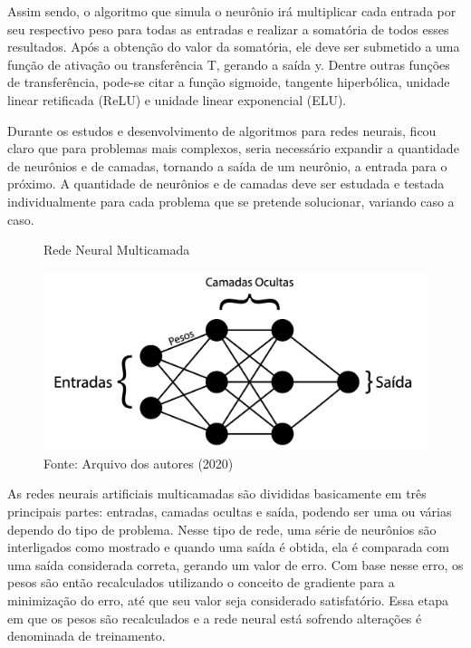 \par Assim sendo, o algoritmo que simula o neurônio irá multiplicar cada entrada por seu respectivo peso para todas as entradas e realizar a somatória de todos esses resultados. Após a obtenção do valor da somatória, ele deve ser submetido a uma função de ativação ou transferência T, gerando a saída y. Dentre outras funções de transferência, pode-se citar a função sigmoide, tangente hiperbólica, unidade linear retificada (ReLU) e unidade linear exponencial (ELU).

\par Durante os estudos e desenvolvimento de algoritmos para redes neurais, ficou claro que para problemas mais complexos, seria necessário expandir a quantidade de neurônios e de camadas, tornando a saída de um neurônio, a entrada para o próximo. A quantidade de neurônios e de camadas deve ser estudada e testada individualmente para cada problema que se pretende solucionar, variando caso a caso.

\begin{figure}[H]
    \centering
    \caption{Rede Neural Multicamada}
    \includegraphics[width=1.0\linewidth]{Imagens/rede-neural.png}
    \caption*{Fonte: Arquivo dos autores (2020)}
    \label{redeneural}
\end{figure}

\par As redes neurais artificiais multicamadas são divididas basicamente em três principais partes: entradas, camadas ocultas e saída, podendo ser uma ou várias dependo do tipo de problema. Nesse tipo de rede, uma série de neurônios são interligados como mostrado e quando uma saída é obtida, ela é comparada com uma saída considerada correta, gerando um valor de erro. Com base nesse erro, os pesos são então recalculados utilizando o conceito de gradiente para a minimização do erro, até que seu valor seja considerado satisfatório. Essa etapa em que os pesos são recalculados e a rede neural está sofrendo alterações é denominada de treinamento.


